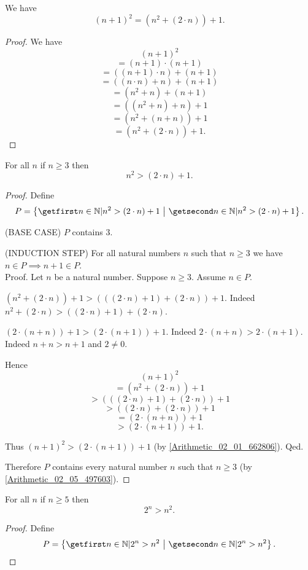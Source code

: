 \documentclass[../../arithmetic.tex]{subfiles}
\begin{document}
  \begin{forthel}
    \begin{proposition}\label{Arithmetic_02_06_276270}
      We have \[ (n + 1)^{2} = (n^{2} + (2 \cdot n)) + 1. \]
    \end{proposition}
    \begin{proof}
      We have
      \[   (n + 1)^{2} \]
      \[ = (n + 1) \cdot (n + 1) \]
      \[ = ((n + 1) \cdot n) + (n + 1) \]
      \[ = ((n \cdot n) + n) + (n + 1) \]
      \[ = (n^{2} + n) + (n + 1) \]
      \[ = ((n^{2} + n) + n) + 1 \]
      \[ = (n^{2} + (n + n)) + 1 \]
      \[ = (n^{2} + (2 \cdot n)) + 1. \]
    \end{proof}


    \begin{proposition}\label{Arithmetic_02_06_671464}
      For all $n$ if $n \geq 3$ then \[ n^{2} > (2 \cdot n) + 1. \]
    \end{proposition}
    \begin{proof}
      Define \[ P = \class{n \in \Nat | n^{2} > (2 \cdot n) + 1}. \]

      (BASE CASE) $P$ contains $3$.

      (INDUCTION STEP) For all natural numbers $n$ such that $n \geq 3$ we have $n \in P \implies n + 1 \in P$. \\
      Proof.
        Let $n$ be a natural number.
        Suppose $n \geq 3$.
        Assume $n \in P$.

        $(n^{2} + (2 \cdot n)) + 1 > (((2 \cdot n) + 1) + (2 \cdot n)) + 1$.
        Indeed $n^{2} + (2 \cdot n) > ((2 \cdot n) + 1) + (2 \cdot n)$.

        $(2 \cdot (n + n)) + 1 > (2 \cdot (n + 1)) + 1$.
        Indeed $2 \cdot (n + n) > 2 \cdot (n + 1)$.
        Indeed $n + n > n + 1$ and $2 \neq 0$.

        Hence
        \[   (n + 1)^{2} \]
        \[ = (n^{2} + (2 \cdot n)) + 1 \]
        \[ > (((2 \cdot n) + 1) + (2 \cdot n)) + 1 \]
        \[ > ((2 \cdot n) + (2 \cdot n)) + 1 \]
        \[ = (2 \cdot (n + n)) + 1 \]
        \[ > (2 \cdot (n + 1)) + 1. \]

        Thus $(n + 1)^{2} > (2 \cdot (n + 1)) + 1$ (by \ref{Arithmetic_02_01_662806}).
      Qed.

      Therefore $P$ contains every natural number $n$ such that $n \geq 3$ (by \ref{Arithmetic_02_05_497603}).
    \end{proof}


    \begin{proposition}\label{Arithmetic_02_06_205395}
      For all $n$ if $n \geq 5$ then \[ 2^{n} > n^{2}. \]
    \end{proposition}
    \begin{proof}
      Define \[ P = \class{n \in \Nat | 2^{n} > n^{2}}. \]


\end{proof}
\end{forthel}
\end{document}
